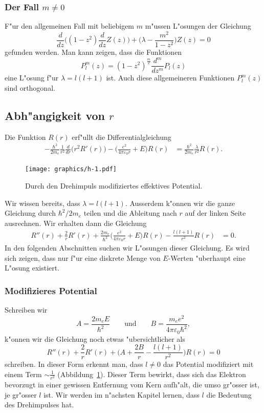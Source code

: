 \subsubsection{Der Fall $m\ne 0$}
F"ur den allgemeinen Fall mit beliebigem $m$ m"ussen L"osungen der
Gleichung
\begin{equation}
\frac{d}{dz}\biggl((1-z^2)\frac{d}{dz}Z(z)\biggr)
+\biggl(\lambda -\frac{m^2}{1-z^2}\biggr)Z(z)=0
\end{equation}
gefunden werden. Man kann zeigen, dass die Funktionen
\[
P_l^m(z)=
(1-z^2)^{\frac{m}2}\frac{d^m}{dz^m}P_l(z)
\]
eine L"osung f"ur $\lambda=l(l+1)$ ist.
Auch diese allgemeineren Funktionen $P_l^m(z)$ sind orthogonal.

\subsection{Abh"angigkeit von $r$}
Die Funktion $R(r)$ erf"ullt die Differentialgleichung
\begin{align}
-\frac{\hbar^2}{2m_e} \frac{1}{r^2}\frac{d}{dr}\bigl(r^2R'(r)\bigr)
-
\biggl(\frac{e^2}{4\pi\varepsilon_0r} + E \biggr) R(r)
&=
\frac{\hbar^2}{2m_e}\frac{\lambda}{r^2}
R(r).
\label{skript:radialgleichung}
\end{align}
\begin{figure}
\centering
\texttt{[image: graphics/h-1.pdf]}
\caption{Durch den Drehimpuls modifiziertes effektives Potential.
\label{skript:modifiziertes-potential}}
\end{figure}%
Wir wissen bereits, dass $\lambda=l(l+1)$.
Ausserdem k"onnen wir die ganze Gleichung durch $\hbar^2/2m_e$ teilen
und die Ableitung nach $r$ auf der linken Seite ausrechnen. 
Wir erhalten dann die Gleichung
\begin{align*}
R''(r)+\frac{2}{r}R'(r)
+\frac{2m_e}{\hbar^2}
\biggl(\frac{e^2}{4\pi\varepsilon_0r} + E \biggr) R(r)
-\frac{l(l+1)}{r^2}
R(r)
&=0.
\end{align*}
In den folgenden Abschnitten suchen wir L"osungen dieser Gleichung.
Es wird sich zeigen, dass nur f"ur eine diskrete Menge von $E$-Werten
"uberhaupt eine L"osung existiert.
\subsubsection{Modifizieres Potential}
Schreiben wir
\begin{equation}
A=\frac{2m_eE}{\hbar^2}
\qquad\text{und}\qquad
B=\frac{m_ee^2}{4\pi\varepsilon_0\hbar^2},
\label{skript:AundB}
\end{equation}
k"onnen wir die Gleichung noch etwas "ubersichtlicher als
\begin{equation}
R''(r)+\frac2{r}R'(r)+\biggl(A+\frac{2B}r-\frac{l(l+1)}{r^2}\biggr)R(r)=0
\label{skript:hreduziert}
\end{equation}
schreiben.
In dieser Form erkennt man, dass $l\ne 0$
das Potential modifiziert mit einem Term
$\sim\frac1{r^2}$ (Abbildung~\ref{skript:modifiziertes-potential}).
Dieser Term bewirkt, dass sich das Elektron bevorzugt in einer
gewissen Entfernung vom Kern aufh"alt, die umso gr"osser ist, je
gr"osser $l$ ist.
Wir werden im n"achsten Kapitel lernen, dass $l$ die Bedeutung des
Drehimpulses hat.


